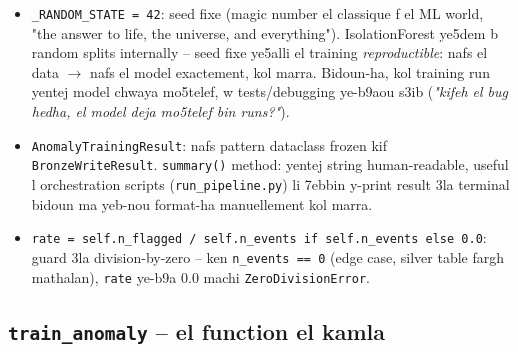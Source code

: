 \documentclass[11pt,a4paper]{report}
\DeclareRobustCommand{\code}[1]{\texttt{#1}}
\begin{document}
\begin{itemize}
  \item \code{\_RANDOM\_STATE = 42}: seed fixe (magic number el classique
        f el ML world, "the answer to life, the universe, and everything").
        IsolationForest ye5dem b random splits internally -- seed fixe
        ye5alli el training \emph{reproductible}: nafs el data $\to$
        nafs el model exactement, kol marra. Bidoun-ha, kol training run
        yentej model chwaya mo5telef, w tests/debugging ye-b9aou s3ib
        (\emph{"kifeh el bug hedha, el model deja mo5telef bin runs?"}).
  \item \code{AnomalyTrainingResult}: nafs pattern dataclass frozen kif
        \code{BronzeWriteResult}. \code{summary()} method: yentej string
        human-readable, useful l orchestration scripts (\code{run\_pipeline.py})
        li 7ebbin y-print result 3la terminal bidoun ma yeb-nou format-ha
        manuellement kol marra.
  \item \code{rate = self.n\_flagged / self.n\_events if self.n\_events
        else 0.0}: guard 3la division-by-zero -- ken \code{n\_events == 0}
        (edge case, silver table fargh mathalan), \code{rate} ye-b9a 0.0
        machi \code{ZeroDivisionError}.
\end{itemize}

\subsection{\code{train\_anomaly} -- el function el kamla}
\end{document}
